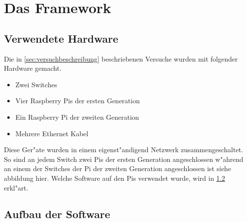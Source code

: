 \chapter{Das Framework}
\label{cha:framework}
\section{Verwendete Hardware} \label{sec:verwendeteHardware}
Die in \cref{sec:versuchbeschreibung} beschriebenen Versuche wurden mit folgender Hardware gemacht. %
\begin{itemize}
\item Zwei Switches
\item Vier Raspberry Pis der ersten Generation
\item Ein Raspberry Pi der zweiten Generation
\item Mehrere Ethernet Kabel
\end{itemize}
Diese Ger"ate wurden in einem eigenst"andigend Netzwerk zusammengeschaltet. So sind an jedem Switch zwei Pis %
der ersten Generation angeschlossen w"ahrend an einem der Switches der Pi der zweiten Generation angeschlossen %
ist siehe abbildung hier. Welche Software auf den Pis verwendet wurde, wird in \cref{sec:aufbauSoftware} erkl"art. 

\section{Aufbau der Software} \label{sec:aufbauSoftware}

